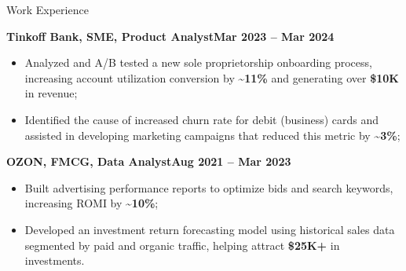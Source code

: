 \documentclass[]{mcdowellcv}
\renewenvironment{cvsubsection}[2]{%
  \begin{adjustwidth}{\subsectionmargin}{\subsectionmargin}%
    {\bfseries #1}\hfill #2\par\vspace{1em}%
}{%
  \end{adjustwidth}%
  \vspace*{\aftersubsectionspace}%
}
\begin{document}
\begin{cvsection}{\Large Work Experience}
		
		\begin{cvsubsection}{Tinkoff Bank, SME, Product Analyst}{\textbf{Mar 2023 -- Mar 2024}}
			\begin{itemize}[itemsep=0.2em]
				\item Analyzed and A/B tested a new sole proprietorship onboarding process, increasing account utilization conversion by \textbf{\textasciitilde 11\%} and generating over \textbf{\$10K} in revenue;
				\item Identified the cause of increased churn rate for debit (business) cards and assisted in developing marketing campaigns that reduced this metric by \textbf{\textasciitilde 3\%};
			\end{itemize}
		\end{cvsubsection}
		
		\begin{cvsubsection}{OZON, FMCG, Data Analyst}{\textbf{Aug 2021 -- Mar 2023}}
			\begin{itemize}[itemsep=0.2em]
				\item Built advertising performance reports to optimize bids and search keywords, increasing ROMI by \textbf{\textasciitilde 10\%};
				\item Developed an investment return forecasting model using historical sales data segmented by paid and organic traffic, helping attract \textbf{\$25K+} in investments.
			\end{itemize}
		\end{cvsubsection}
	\end{cvsection}
	
\end{document}
